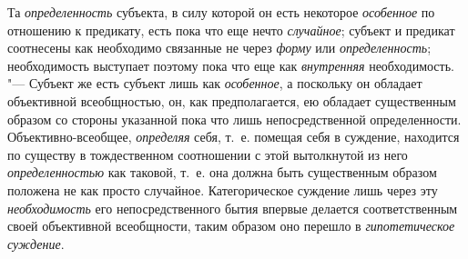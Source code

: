 {Та {\em определенность}
субъекта, в силу которой он есть некоторое
{\em особенное} по
отношению к предикату, есть пока что еще нечто
{\em случайное}; субъект
и предикат соотнесены как необходимо связанные не через
{\em форму} или
{\em определенность};
необходимость выступает поэтому пока что еще как
{\em внутренняя}
необходимость. "--- Субъект же есть субъект лишь
как {\em особенное}, а
поскольку он обладает объективной всеобщностью, он, как предполагается, ею
обладает существенным образом со стороны указанной пока что лишь
непосредственной определенности. Объективно-всеобщее,
{\em определяя} себя,
т.~е. помещая себя в суждение, находится по существу в тождественном
соотношении с этой вытолкнутой из него
{\em определенностью} как
таковой, т.~е. она должна быть существенным образом положена не как просто
случайное. Категорическое суждение лишь через эту
{\em необходимость} его
непосредственного бытия впервые делается соответственным своей объективной
всеобщности, таким образом оно перешло в
{\em гипотетическое суждение}.

}
